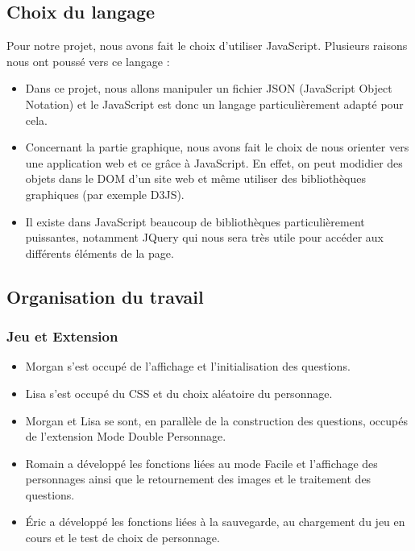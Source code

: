 \documentclass{article}
\begin{document}
        \subsection{Choix du langage}
            Pour notre projet, nous avons fait le choix d’utiliser JavaScript. Plusieurs raisons nous ont poussé vers ce langage :
            \begin{itemize}
                \item
                    Dans ce projet, nous allons manipuler un fichier JSON (JavaScript Object Notation) et le JavaScript est donc un langage particulièrement adapté pour cela.
                \item
                    Concernant la partie graphique, nous avons fait le choix de nous orienter vers une application web et ce grâce à JavaScript. En effet, on peut modidier des objets dans le DOM d’un site web et même utiliser des bibliothèques graphiques (par exemple D3JS).
                \item 
                    Il existe dans JavaScript beaucoup de bibliothèques particulièrement puissantes, notamment JQuery qui nous sera très utile pour accéder aux différents éléments de la page.
            \end{itemize}

        \subsection{Organisation du travail}
            \subsubsection{Jeu et Extension}
                \begin{itemize}
                    \item Morgan s’est occupé de l’affichage et l’initialisation des questions.
                    \item Lisa s’est occupé du CSS et du choix aléatoire du personnage.
                    \item Morgan et Lisa se sont, en parallèle de la construction des questions, occupés de l’extension \textsf{Mode Double Personnage}.
                    \item Romain a développé les fonctions liées au mode \textsf{Facile} et l’affichage des personnages ainsi que le retournement des images et le traitement des questions.
                    \item  Éric a développé les fonctions liées à la sauvegarde, au chargement du jeu en cours et le test de choix de personnage.
                \end{itemize}
\end{document}
